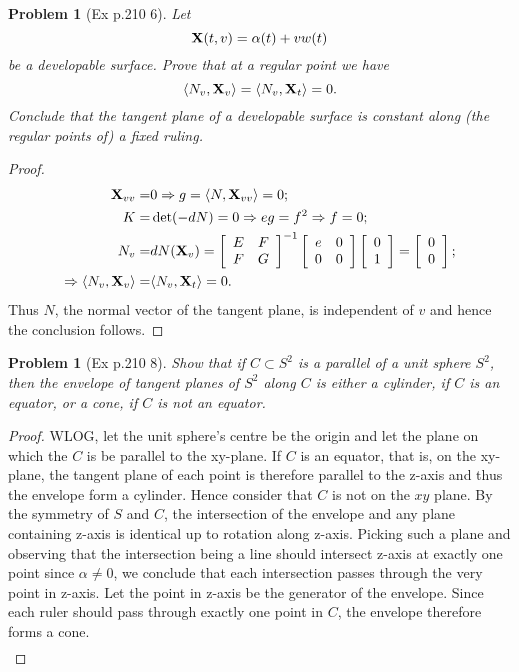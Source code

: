 \documentclass[10pt,a4paper]{article}
\newcounter{theProblemCounter}
\newtheorem{problem}[theProblemCounter]{Problem}
\begin{document}
\setcounter{theProblemCounter}{3}
\begin{problem}[Ex p.210 6]
Let \[
\mathbf{X}(t, v)=\alpha(t)+vw(t)
\]
be a developable surface. Prove that at a regular point we have
\[
\left\langle N_v, \mathbf{X}_v\right\rangle
=\left\langle N_v, \mathbf{X}_t\right\rangle=0.\]
Conclude that \emph{the tangent plane of a developable surface is constant along} (the regular points of) \emph{a fixed ruling}.
\end{problem}
\begin{proof}
\begin{align*}
\mathbf{X}_{vv}=&0 \Rightarrow g=\langle N, \mathbf{X}_{vv}\rangle = 0; \\
K=&\det(-dN)=0 \Rightarrow eg=f^2 \Rightarrow f = 0; \\
N_v =& dN(\mathbf{X}_v) = \left[\begin{array}{cc}E&F\\F&G\end{array}\right]^{-1}\left[\begin{array}{cc}e&0\\0&0\end{array}\right]\left[\begin{array}{c}0\\1\end{array}\right]=\left[\begin{array}{c}0\\0\end{array}\right]; \\
\Rightarrow \langle N_v, \mathbf{X}_v\rangle =& \langle N_v, \mathbf{X}_t\rangle = 0.
\end{align*}
Thus $N$, the normal vector of the tangent plane, is independent of $v$ and hence the conclusion follows.
\end{proof}

\setcounter{theProblemCounter}{4}
\begin{problem}[Ex p.210 8]
Show that if $C\subset S^2$ is a parallel of a unit sphere $S^2$, then the envelope of tangent planes of $S^2$ along $C$ is either a cylinder, if $C$ is an equator, or a cone, if $C$ is not an equator.
\end{problem}
\begin{proof}
WLOG, let the unit sphere's centre be the origin and let the plane on which the $C$ is be parallel to the xy-plane. If $C$ is an equator, that is, on the xy-plane, the tangent plane of each point is therefore parallel to the z-axis and thus the envelope form a cylinder. Hence consider that $C$ is not on the $xy$ plane.  By the symmetry of $S$ and $C$, the intersection of the envelope and any plane containing z-axis is identical up to rotation along z-axis. Picking such a plane and observing that the intersection being a line should intersect z-axis at exactly one point since $\alpha \neq 0$, we conclude that each intersection passes through the very point in z-axis. Let the point in z-axis be the generator of the envelope. Since each ruler should pass through exactly one point in $C$, the envelope therefore forms a cone.
\begin{align*}
\end{align*}
\end{proof}
\end{document}
